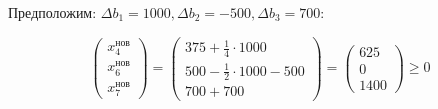 Предположим: $\Delta b_1 = 1000, \Delta b_2 = -500, \Delta b_3 = 700$:

\[
    \begin{pmatrix}
        x_4^{\text{нов}} \\
        x_6^{\text{нов}} \\
        x_7^{\text{нов}}
    \end{pmatrix}
    =
    \begin{pmatrix}
        375 + \frac{1}{4} \cdot 1000       \\
        500 - \frac{1}{2} \cdot 1000 - 500 \\
        700 + 700
    \end{pmatrix} = \begin{pmatrix}
        625 \\
        0   \\
        1400
    \end{pmatrix} \geq 0
\]
